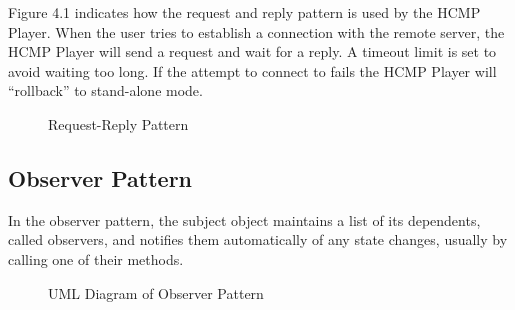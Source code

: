 Figure 4.1 indicates how the request and reply pattern is used by the HCMP Player. 
When the user tries to establish a connection with the remote server, the HCMP Player 
will send a request and wait for a reply. A timeout limit is set to 
avoid waiting too long. If the attempt to connect to fails the HCMP Player
will ``rollback'' to stand-alone mode.
\begin{figure}[H]
\caption{Request-Reply Pattern}
\label{fig:speciation}
\end{figure}

\subsection{Observer Pattern}
In the observer pattern, the subject object maintains a list of its 
dependents, called observers, and notifies them automatically of 
any state changes, usually by calling one of their methods.
\begin{figure}[H]
\caption{UML Diagram of Observer Pattern}
\label{fig:speciation}
\end{figure}

